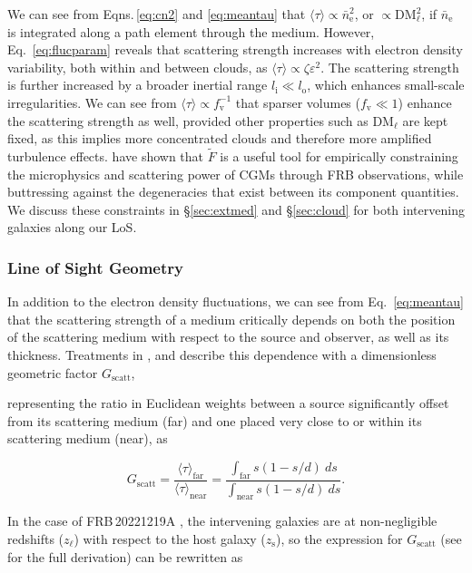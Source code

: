 \documentclass[twocolumn, linenumbers, tra]{aastex631}
\newcommand{\nihari}{FRB\,20221219A } %
\begin{document}
{We can see from Eqns.\,\ref{eq:cn2} and \ref{eq:meantau} that $\langle \tau \rangle \propto \bar{n}_{\mathrm{e}}^2$, or $\propto \mathrm{DM}_{\ell}^2$, if $\bar{n}_{\mathrm{e}}$ is integrated along a path element through the medium. However, Eq.~\ref{eq:flucparam} reveals that scattering strength increases with electron density variability, both within and between clouds, as $\langle \tau \rangle \propto \zeta \varepsilon^2$. The scattering strength is further increased by a broader inertial range $l_\mathrm{i} \ll l_\mathrm{o}$, which enhances small-scale irregularities. We can see from $\langle \tau \rangle \propto f_{\mathrm{v}}^{-1}$ that sparser volumes ($f_{\mathrm{v}} \ll 1$) enhance the scattering strength as well, provided other properties such as $\mathrm{DM}_\ell$ are kept fixed, as this implies more concentrated clouds and therefore more amplified turbulence effects. \citet{Ocker2025} have shown that $\widetilde{F}$ is a useful tool for empirically constraining the microphysics and scattering power of CGMs through FRB observations, while buttressing against the degeneracies that exist between its component quantities. We discuss these constraints in \S\ref{sec:extmed} and \S\ref{sec:cloud} for both intervening galaxies along our LoS.} %

\subsubsection{Line of Sight Geometry}\label{sec:scatgeo}

In addition to the electron density fluctuations, we can see from Eq.~\ref{eq:meantau} that the scattering strength of a medium critically depends on both the position of the scattering medium with respect to the source and observer, as well as its thickness. Treatments in \citet{Ocker2021}, and \citet{Cordes2022} describe this dependence with a dimensionless geometric factor $G_{\mathrm{scatt}}$, {representing the ratio in Euclidean weights between a source significantly offset from its scattering medium (far) and one placed very close to or within its scattering medium (near), as

\begin{equation}
G_{\mathrm{scatt}} = \frac{\langle \tau \rangle_{\mathrm{far}}}{\langle \tau \rangle_{\mathrm{near}}} = \frac{\int_{\mathrm{far}} s(1-s/d)\ ds }{\int_{\mathrm{near}} s(1-s/d)\ ds}.
\end{equation}} %
\noindent

In the case of \nihari, the intervening galaxies are at non-negligible redshifts ($z_{\ell}$) with respect to the host galaxy ($z_{\mathrm{s}}$), so the expression for $G_{\mathrm{scatt}}$ (see \citet{Cordes2022} for the full derivation) can be rewritten as
\end{document}
